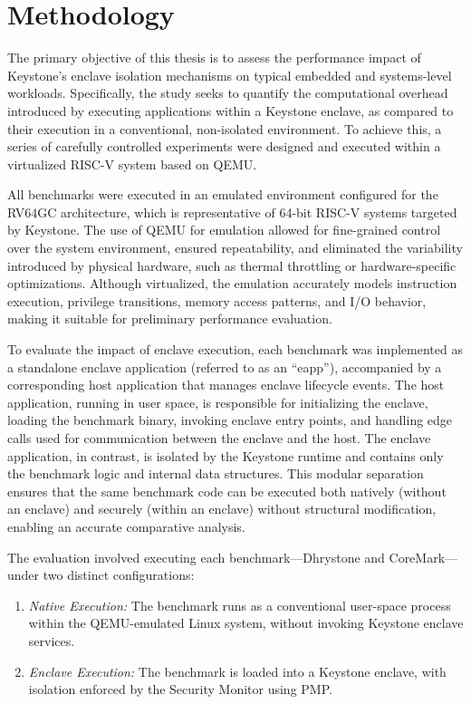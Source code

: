 \chapter{Methodology}
\label{chap:methodology}
The primary objective of this thesis is to assess the performance impact of Keystone’s enclave isolation mechanisms on typical embedded and systems-level workloads. Specifically, the study seeks to quantify the computational overhead introduced by executing applications within a Keystone enclave, as compared to their execution in a conventional, non-isolated environment. To achieve this, a series of carefully controlled experiments were designed and executed within a virtualized RISC-V system based on QEMU.

All benchmarks were executed in an emulated environment configured for the RV64GC architecture, which is representative of 64-bit RISC-V systems targeted by Keystone. The use of QEMU for emulation allowed for fine-grained control over the system environment, ensured repeatability, and eliminated the variability introduced by physical hardware, such as thermal throttling or hardware-specific optimizations. Although virtualized, the emulation accurately models instruction execution, privilege transitions, memory access patterns, and I/O behavior, making it suitable for preliminary performance evaluation.

To evaluate the impact of enclave execution, each benchmark was implemented as a standalone enclave application (referred to as an “eapp”), accompanied by a corresponding host application that manages enclave lifecycle events. The host application, running in user space, is responsible for initializing the enclave, loading the benchmark binary, invoking enclave entry points, and handling edge calls used for communication between the enclave and the host. The enclave application, in contrast, is isolated by the Keystone runtime and contains only the benchmark logic and internal data structures. This modular separation ensures that the same benchmark code can be executed both natively (without an enclave) and securely (within an enclave) without structural modification, enabling an accurate comparative analysis.

The evaluation involved executing each benchmark—Dhrystone and CoreMark—under two distinct configurations:

\begin{enumerate}
\item \textit{Native Execution:} The benchmark runs as a conventional user-space process within the QEMU-emulated Linux system, without invoking Keystone enclave services.
\item \textit{Enclave Execution:} The benchmark is loaded into a Keystone enclave, with isolation enforced by the Security Monitor using PMP.
\end{enumerate}


